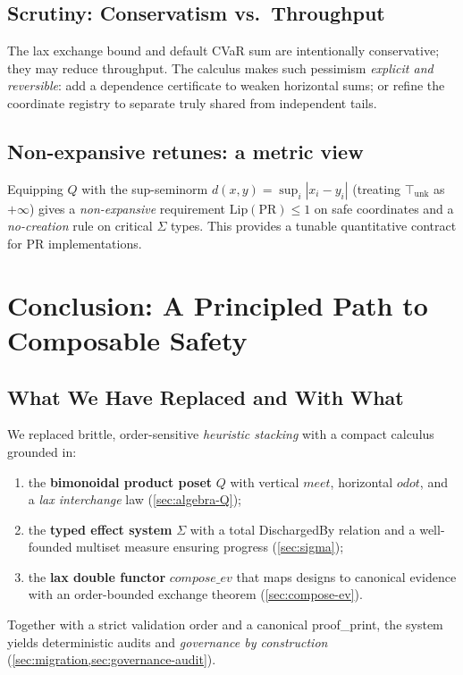\documentclass[11pt]{article}
\theoremstyle{plain}
\theoremstyle{definition}
\theoremstyle{remark}
\def\Q{Q}%
\def\Sig{\Sigma}%
\def\composeev{compose\_ev}%
\def\vmeet{meet}%
\def\hplus{odot}%
\def\code#1{#1}%
\DeclareRobustCommand{\Q}{\texorpdfstring{\ensuremath{\mathcal{Q}}}{Q}}     %
\DeclareRobustCommand{\Sig}{\texorpdfstring{\ensuremath{\Sigma}}{\Sigma}}   %
\DeclareMathOperator{\composeevOp}{compose\_ev}
\DeclareRobustCommand{\composeev}{\texorpdfstring{\ensuremath{\composeevOp}}{compose\_ev}}
\newcommand{\unk}{\top_{\mathrm{unk}}}         %
\newcommand{\vmeet}{\wedge}                    %
\newcommand{\hplus}{\odot}                     %
\newcommand{\code}[1]{\texttt{\textup{#1}}}    %
\def\Q{Q}%
\def\Sig{\Sigma}%
\def\composeev{compose\_ev}%
\def\vmeet{meet}%
\def\hplus{odot}%
\def\code#1{#1}%
\begin{document}
\subsection{Scrutiny: Conservatism vs.\ Throughput}
The lax exchange bound and default CVaR sum are intentionally conservative; they may reduce throughput. The calculus makes such pessimism \emph{explicit and reversible}: add a dependence certificate to weaken horizontal sums; or refine the coordinate registry to separate truly shared from independent tails.

\subsection{Non-expansive retunes: a metric view}
Equipping $\Q$ with the sup-seminorm $d(x,y)=\sup_i|x_i-y_i|$ (treating $\unk$ as $+\infty$) gives a \emph{non-expansive} requirement $\mathrm{Lip}(\mathrm{PR})\le1$ on safe coordinates and a \emph{no-creation} rule on critical $\Sig$ types. This provides a tunable quantitative contract for PR implementations.


\section{Conclusion: A Principled Path to Composable Safety}
\label{sec:conclusion}

\subsection{What We Have Replaced and With What}
We replaced brittle, order-sensitive \emph{heuristic stacking} with a compact calculus grounded in:
\begin{enumerate}[leftmargin=2em,label=(C\arabic*)]
  \item the \textbf{bimonoidal product poset} \(\Q\) with vertical \(\vmeet\), horizontal \(\hplus\), and a \emph{lax interchange} law (\cref{sec:algebra-Q});
  \item the \textbf{typed effect system} \(\Sig\) with a total \code{DischargedBy} relation and a well-founded multiset measure ensuring progress (\cref{sec:sigma});
  \item the \textbf{lax double functor} $\composeev$ that maps designs to canonical evidence with an order-bounded exchange theorem (\cref{sec:compose-ev}).
\end{enumerate}
Together with a strict validation order and a canonical \code{proof\_print}, the system yields deterministic audits and \emph{governance by construction} (\cref{sec:migration,sec:governance-audit}).
\end{document}
